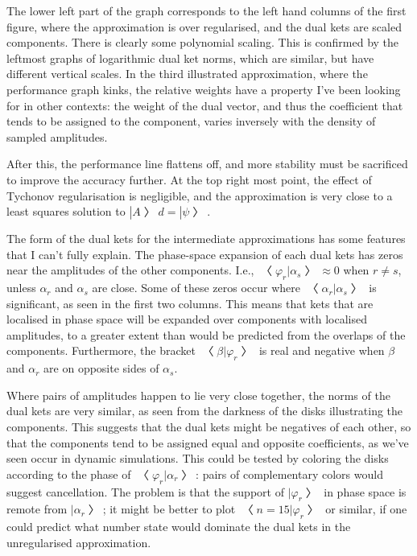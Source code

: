 The lower left part of the graph corresponds to the left hand columns of the first figure, where the approximation is over regularised, and the dual kets are scaled components.  There is clearly some polynomial scaling.  This is confirmed by the leftmost graphs of logarithmic dual ket norms, which are similar, but have different vertical scales.  In the third illustrated approximation, where the performance graph kinks, the relative weights have a property I've been looking for in other contexts: the weight of the dual vector, and thus the coefficient that tends to be assigned to the component, varies inversely with the density of sampled amplitudes.

After this, the performance line flattens off, and more stability must be sacrificed to improve the accuracy further.  At the top right most point, the effect of Tychonov  regularisation is negligible, and the approximation is very close to a least squares solution to $|A〉d=|ψ〉$.

The form of the dual kets for the intermediate approximations has some features that I can't fully explain.  The phase-space expansion of each dual kets has zeros near the amplitudes of the other components.  I.e., $〈φ_r|α_s〉≈0$ when $r≠s$, unless $α_r$ and $α_s$ are close.  Some of these zeros occur where $〈α_r|α_s〉$ is significant, as seen in the first two columns.  This means that kets that are localised in phase space will be expanded over components with localised amplitudes, to a greater extent than would be predicted from the overlaps of the components.  Furthermore, the bracket $〈β|φ_r〉$ is real and negative when $β$ and $α_r$ are on opposite sides of $α_s$.

Where pairs of amplitudes happen to lie very close together, the norms of the dual kets are very similar, as seen from the darkness of the disks illustrating the components.  This suggests that the dual kets might be negatives of each other, so that the components tend to be assigned equal and opposite coefficients, as we've seen occur in dynamic simulations.  This could be tested by coloring the disks according to the phase of $〈φ_r|α_r〉$: pairs of complementary colors would suggest cancellation.  The problem is that the support of $|φ_r〉$ in phase space is remote from $|α_r〉$; it might be better to plot $〈n=15|φ_r〉$ or similar, if one could predict what number state would dominate the dual kets in the unregularised approximation.

\bye
